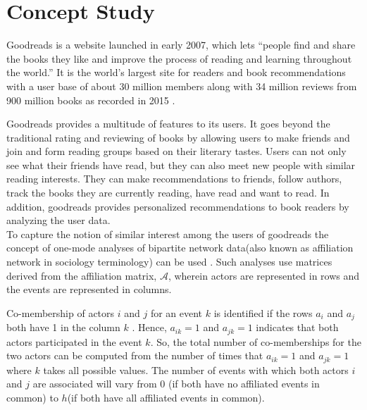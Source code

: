 \documentclass[11pt]{article}
\begin{document}
\maketitle
\newpage

\section{Concept Study}
Goodreads is a website launched in early 2007, which lets ``people find and share the books they like and improve the process of reading and learning throughout the world.'' It is the world's largest site for readers and book recommendations with a user base of about  30 million members along with 34 million reviews from 900 million books as recorded in 2015 \cite{goodreads:aboutus}.

Goodreads provides a multitude of features to its users. It goes beyond the traditional rating and reviewing of books by allowing users to make friends and join and form reading groups based on their literary tastes.
Users can not only see what their friends have read, but they can also meet new people with similar reading interests. They can make recommendations to friends, follow authors, track the books they are currently reading, have read and want to read. In addition, goodreads provides personalized recommendations to book readers by analyzing the user data. \\

To capture the notion of similar interest among the users of goodreads  the concept of one-mode analyses of bipartite network data(also known as affiliation network in sociology terminology) can be used \cite{wasserman}. Such analyses use matrices derived from the affiliation matrix, $\mathcal{A}$, wherein actors are represented in rows and the events are represented in columns.

Co-membership of actors $i$ and $j$ for an event $k$ is identified if the rows $a_i$ and $a_j$ both have 1 in the column $k$ .
Hence,  $a_{ik} = 1$ and $a_{jk} = 1$ indicates that both actors participated in the event $k$. So, the total number of co-memberships for the two actors can be computed from the number of times that $a_{ik} = 1$ and $a_{jk} = 1$ where $k$ takes all possible values. The number of events with which both actors $i$ and $j$ are associated will vary from 0 (if both have no affiliated events in common) to $h$(if both have all affiliated events in common).\\
\end{document}
